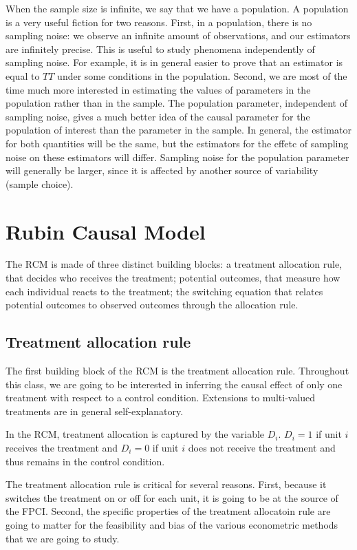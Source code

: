 \documentclass[]{book}
\theoremstyle{definition}
\theoremstyle{definition}
\theoremstyle{definition}
\theoremstyle{remark}
\begin{document}
When the sample size is infinite, we say that we have a population. A
population is a very useful fiction for two reasons. First, in a
population, there is no sampling noise: we observe an infinite amount of
observations, and our estimators are infinitely precise. This is useful
to study phenomena independently of sampling noise. For example, it is
in general easier to prove that an estimator is equal to \(TT\) under
some conditions in the population. Second, we are most of the time much
more interested in estimating the values of parameters in the population
rather than in the sample. The population parameter, independent of
sampling noise, gives a much better idea of the causal parameter for the
population of interest than the parameter in the sample. In general, the
estimator for both quantities will be the same, but the estimators for
the effetc of sampling noise on these estimators will differ. Sampling
noise for the population parameter will generally be larger, since it is
affected by another source of variability (sample choice).

\section{Rubin Causal Model}\label{rubin-causal-model}

The RCM is made of three distinct building blocks: a treatment
allocation rule, that decides who receives the treatment; potential
outcomes, that measure how each individual reacts to the treatment; the
switching equation that relates potential outcomes to observed outcomes
through the allocation rule.

\subsection{Treatment allocation rule}\label{treatment-allocation-rule}

The first building block of the RCM is the treatment allocation rule.
Throughout this class, we are going to be interested in inferring the
causal effect of only one treatment with respect to a control condition.
Extensions to multi-valued treatments are in general self-explanatory.

In the RCM, treatment allocation is captured by the variable \(D_i\).
\(D_i=1\) if unit \(i\) receives the treatment and \(D_i=0\) if unit
\(i\) does not receive the treatment and thus remains in the control
condition.

The treatment allocation rule is critical for several reasons. First,
because it switches the treatment on or off for each unit, it is going
to be at the source of the FPCI. Second, the specific properties of the
treatment allocatoin rule are going to matter for the feasibility and
bias of the various econometric methods that we are going to study.
\end{document}
